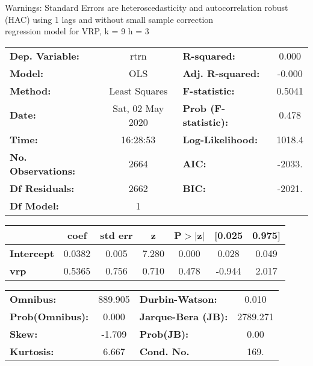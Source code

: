 Warnings: \newline
 [1] Standard Errors are heteroscedasticity and autocorrelation robust (HAC) using 1 lags and without small sample correction\\ 

regression model for VRP, k = 9 h = 3\begin{center}
\begin{tabular}{lclc}
\toprule
\textbf{Dep. Variable:}    &       rtrn       & \textbf{  R-squared:         } &     0.000   \\
\textbf{Model:}            &       OLS        & \textbf{  Adj. R-squared:    } &    -0.000   \\
\textbf{Method:}           &  Least Squares   & \textbf{  F-statistic:       } &    0.5041   \\
\textbf{Date:}             & Sat, 02 May 2020 & \textbf{  Prob (F-statistic):} &    0.478    \\
\textbf{Time:}             &     16:28:53     & \textbf{  Log-Likelihood:    } &    1018.4   \\
\textbf{No. Observations:} &        2664      & \textbf{  AIC:               } &    -2033.   \\
\textbf{Df Residuals:}     &        2662      & \textbf{  BIC:               } &    -2021.   \\
\textbf{Df Model:}         &           1      & \textbf{                     } &             \\
\bottomrule
\end{tabular}
\begin{tabular}{lcccccc}
                   & \textbf{coef} & \textbf{std err} & \textbf{z} & \textbf{P$> |$z$|$} & \textbf{[0.025} & \textbf{0.975]}  \\
\midrule
\textbf{Intercept} &       0.0382  &        0.005     &     7.280  &         0.000        &        0.028    &        0.049     \\
\textbf{vrp}       &       0.5365  &        0.756     &     0.710  &         0.478        &       -0.944    &        2.017     \\
\bottomrule
\end{tabular}
\begin{tabular}{lclc}
\textbf{Omnibus:}       & 889.905 & \textbf{  Durbin-Watson:     } &    0.010  \\
\textbf{Prob(Omnibus):} &   0.000 & \textbf{  Jarque-Bera (JB):  } & 2789.271  \\
\textbf{Skew:}          &  -1.709 & \textbf{  Prob(JB):          } &     0.00  \\
\textbf{Kurtosis:}      &   6.667 & \textbf{  Cond. No.          } &     169.  \\
\bottomrule
\end{tabular}
\end{center}

